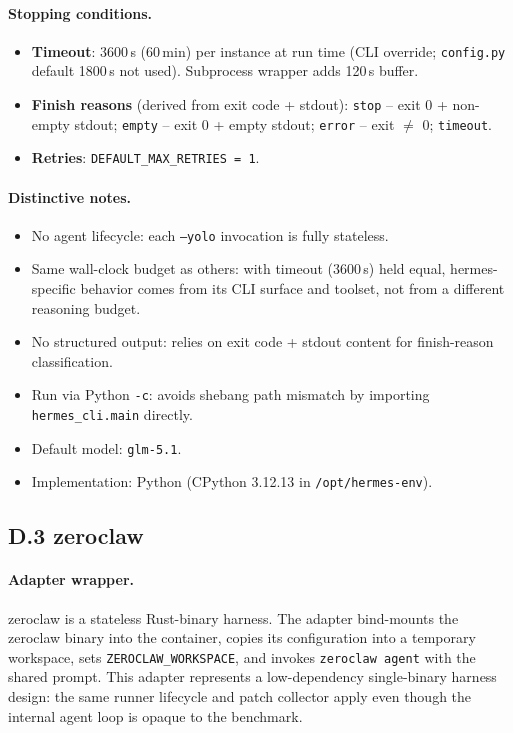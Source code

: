 \paragraph{Stopping conditions.}
\begin{itemize}
  \item \textbf{Timeout}: 3600\,s (60\,min) per instance at run time (CLI override; \texttt{config.py} default 1800\,s not used). Subprocess wrapper adds 120\,s buffer.
  \item \textbf{Finish reasons} (derived from exit code + stdout): \texttt{stop} -- exit 0 + non-empty stdout; \texttt{empty} -- exit 0 + empty stdout; \texttt{error} -- exit $\neq$ 0; \texttt{timeout}.
  \item \textbf{Retries}: \texttt{DEFAULT\_MAX\_RETRIES = 1}.
\end{itemize}

\paragraph{Distinctive notes.}
\begin{itemize}
  \item No agent lifecycle: each \texttt{--yolo} invocation is fully stateless.
  \item Same wall-clock budget as others: with timeout (3600\,s) held equal, hermes-specific behavior comes from its CLI surface and toolset, not from a different reasoning budget.
  \item No structured output: relies on exit code + stdout content for finish-reason classification.
  \item Run via Python \texttt{-c}: avoids shebang path mismatch by importing \texttt{hermes\_cli.main} directly.
  \item Default model: \texttt{glm-5.1}.
  \item Implementation: Python (CPython 3.12.13 in \texttt{/opt/hermes-env}).
\end{itemize}

\subsection*{D.3 zeroclaw}

\paragraph{Adapter wrapper.}
zeroclaw is a stateless Rust-binary harness. The adapter bind-mounts the zeroclaw binary into the container, copies its configuration into a temporary workspace, sets \texttt{ZEROCLAW\_WORKSPACE}, and invokes \texttt{zeroclaw agent} with the shared prompt. This adapter represents a low-dependency single-binary harness design: the same runner lifecycle and patch collector apply even though the internal agent loop is opaque to the benchmark.



